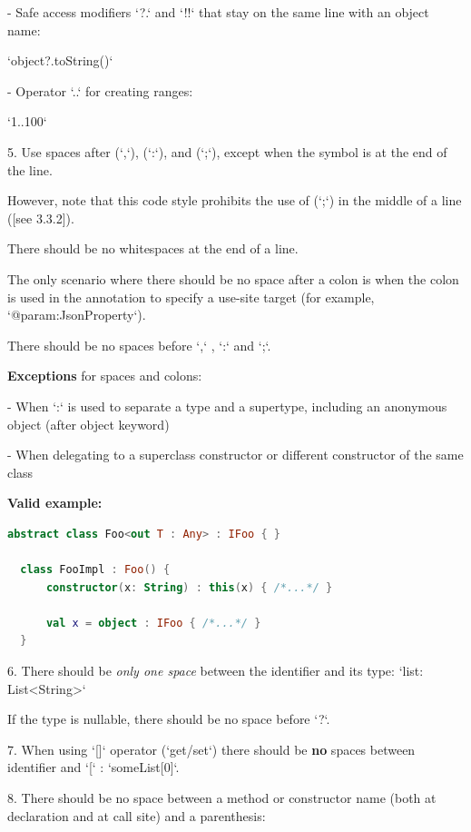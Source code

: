 {{{{- Safe access modifiers `?.` and `!!` that stay on the same line with an object name:\

  `object?.toString()`

- Operator `..` for creating ranges:\

  `1..100`



5.  Use spaces after (`,`), (`:`), and (`;`), except when the symbol is at the end of the line.

    However, note that this code style prohibits the use of (`;`) in the middle of a line ([see 3.3.2]).

    There should be no whitespaces at the end of a line.

    The only scenario where there should be no space after a colon is when the colon is used in the annotation to specify a use-site target (for example, `@param:JsonProperty`).

    There should be no spaces before `,` , `:` and `;`. 

    

    \textbf{Exceptions} for spaces and colons:

    

    - When `:` is used to separate a type and a supertype, including an anonymous object (after object keyword)

    - When delegating to a superclass constructor or different constructor of the same class



\textbf{Valid example:}

\begin{lstlisting}[language=Kotlin]
  abstract class Foo<out T : Any> : IFoo { }
  
  class FooImpl : Foo() {
      constructor(x: String) : this(x) { /*...*/ }
      
      val x = object : IFoo { /*...*/ } 
  }
\end{lstlisting}


6. There should be \textit{only one space} between the identifier and its type: `list: List<String>`

If the type is nullable, there should be no space before `?`.



7. When using `[]` operator (`get/set`) there should be \textbf{no} spaces between identifier and `[` : `someList[0]`.



8. There should be no space between a method or constructor name (both at declaration and at call site) and a parenthesis:

}}}}
